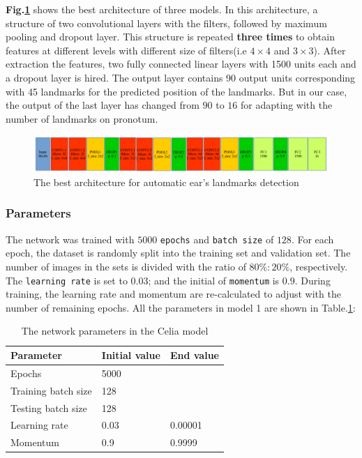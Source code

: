 \documentclass[12pt,a4paper]{article}
\begin{document}
\textbf{Fig.\ref{1Econv}} shows the best architecture of three models. In this architecture, a structure of two convolutional layers with the filters, followed by maximum pooling and dropout layer. This structure is repeated \textbf{three times} to obtain features at different levels with different size of filters(i.e $4 \times 4$ and $3 \times 3$). After extraction the features, two fully connected linear layers with 1500 units each and a dropout layer is hired. The output layer contains 90 output units corresponding with 45 landmarks for the predicted position of the landmarks. But in our case, the output of the last layer has changed from $90$ to $16$ for adapting with the number of landmarks on pronotum.
\begin{figure}[h!]
	\centering
	\includegraphics[scale=0.45]{images/ear_cnn2}
	\caption{The best architecture for automatic ear's landmarks detection}
	\label{1Econv}
\end{figure}
\subsubsection{Parameters}
The network was trained with $5000$ \texttt{epochs} and \texttt{batch size} of $128$. For each epoch, the dataset is randomly split into the training set and validation set. The number of images in the sets is divided with the ratio of $80\%:20\%$, respectively. The \texttt{learning rate} is set to $0.03$; and the initial of \texttt{momentum} is $0.9$. During training, the learning rate and momentum are re-calculated to adjust with the number of remaining epochs. All the parameters in model 1 are shown in Table.\ref{celiaparameters}:
\begin{table}[h!]
	\centering
	\begin{tabular}{l l l}
	Parameter & Initial value & End value \\ \hline
	Epochs & 5000 &  \\ \hline
	Training batch size & 128 & \\ \hline
	Testing batch size & 128 & \\ \hline
	Learning rate & 0.03 & 0.00001 \\ \hline
	Momentum & 0.9 & 0.9999 \\ \hline
	\end{tabular}
	\caption{The network parameters in the Celia model}
	\label{celiaparameters}
\end{table}~\\
\end{document}
